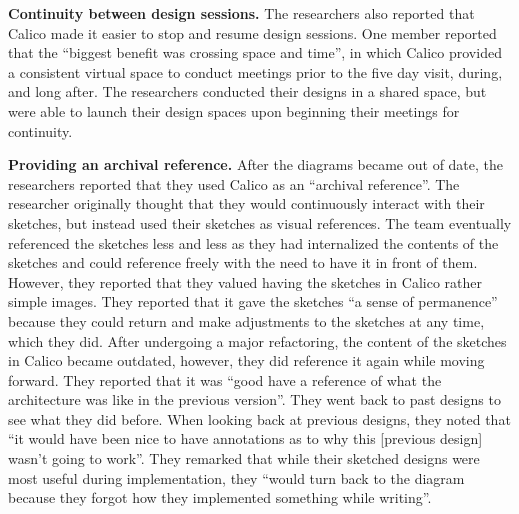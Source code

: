 
\textbf{Continuity between design sessions.} The researchers also reported that Calico made it easier to stop and resume design sessions. One member reported that the ``biggest benefit was crossing space and time'', in which Calico provided a consistent virtual space to conduct meetings prior to the five day visit, during, and long after. The researchers conducted their designs in a shared space, but were able to launch their design spaces upon beginning their meetings for continuity.


\textbf{Providing an archival reference.} After the diagrams became out of date, the researchers reported that they used Calico as an ``archival reference''. The researcher originally thought that they would continuously interact with their sketches, but instead used their sketches as visual references. The team eventually referenced the sketches less and less as they had internalized the contents of the sketches and could reference freely with the need to have it in front of them. However, they reported that they valued having the sketches in Calico rather simple images. They reported that it gave the sketches ``a sense of permanence'' because they could return and make adjustments to the sketches at any time, which they did. After undergoing a major refactoring, the content of the sketches in Calico became outdated, however, they did reference it again while moving forward. They reported that it was ``good have a reference of what the architecture was like in the previous version''. They went back to past designs to see what they did before. When looking back at previous designs, they noted that ``it would have been nice to have annotations as to why this [previous design] wasn't going to work''. They remarked that while their sketched designs were most useful during implementation, they ``would turn back to the diagram because they forgot how they implemented something while writing''.

